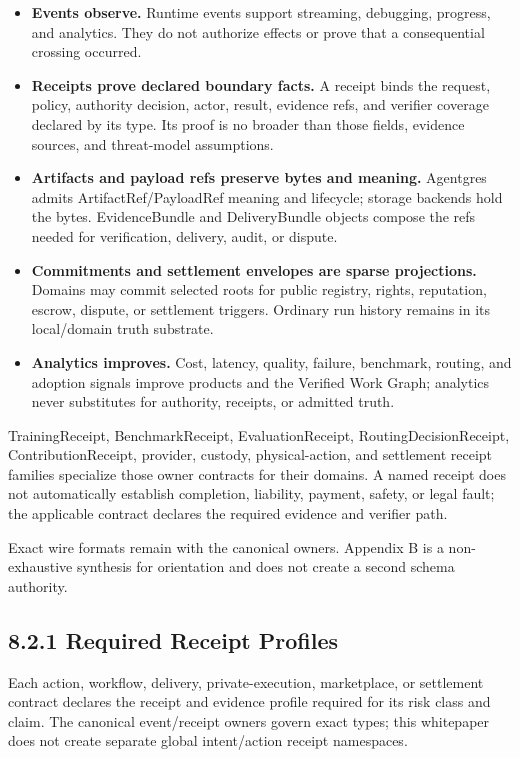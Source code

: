 \documentclass[
  11pt,
]{article}
\providecommand{\tightlist}{%
  \setlength{\itemsep}{0pt}\setlength{\parskip}{0pt}}
\begin{document}
\begin{itemize}
\tightlist
\item
  \textbf{Events observe.} Runtime events support streaming, debugging,
  progress, and analytics. They do not authorize effects or prove that a
  consequential crossing occurred.
\item
  \textbf{Receipts prove declared boundary facts.} A receipt binds the
  request, policy, authority decision, actor, result, evidence refs, and
  verifier coverage declared by its type. Its proof is no broader than those
  fields, evidence sources, and threat-model assumptions.
\item
  \textbf{Artifacts and payload refs preserve bytes and meaning.}
  Agentgres admits ArtifactRef/PayloadRef meaning and lifecycle; storage
  backends hold the bytes. EvidenceBundle and DeliveryBundle objects compose
  the refs needed for verification, delivery, audit, or dispute.
\item
  \textbf{Commitments and settlement envelopes are sparse projections.}
  Domains may commit selected roots for public registry, rights, reputation,
  escrow, dispute, or settlement triggers. Ordinary run history remains in its
  local/domain truth substrate.
\item
  \textbf{Analytics improves.} Cost, latency, quality, failure, benchmark,
  routing, and adoption signals improve products and the Verified Work Graph;
  analytics never substitutes for authority, receipts, or admitted truth.
\end{itemize}

TrainingReceipt, BenchmarkReceipt, EvaluationReceipt,
RoutingDecisionReceipt, ContributionReceipt, provider, custody, physical-action,
and settlement receipt families specialize those owner contracts for their
domains. A named receipt does not automatically establish completion,
liability, payment, safety, or legal fault; the applicable contract declares
the required evidence and verifier path.

Exact wire formats remain with the canonical owners. Appendix B is a
non-exhaustive synthesis for orientation and does not create a second schema
authority.
\hypertarget{the-required-receipt-sets-rrs}{%
\subsection{8.2.1 Required Receipt
Profiles}\label{the-required-receipt-sets-rrs}}

Each action, workflow, delivery, private-execution, marketplace, or
settlement contract declares the receipt and evidence profile required for
its risk class and claim. The canonical event/receipt owners govern exact
types; this whitepaper does not create separate global intent/action receipt
namespaces.
\end{document}
